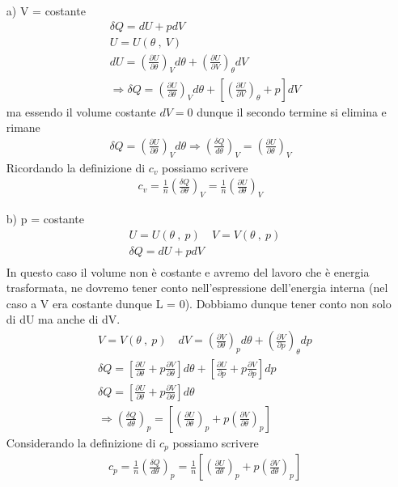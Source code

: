\documentclass[
10pt, %
a4paper, %
oneside, %
headinclude,footinclude, %
BCOR5mm, %
]{scrartcl}
\begin{document}
\begin{itemize}
	\item[a)] V = costante\\
	\begin{align*} 
		&\delta Q = dU + pdV\\
		&U = U(\theta\ ,\ V)\\
		&dU = \left(\frac{\partial U}{\partial \theta}\right)_V d\theta +\left(\frac{\partial U}{\partial V}\right)_{\theta} dV\\
		&\Rightarrow \delta Q = \left(\frac{\partial U}{\partial \theta}\right)_V d\theta +\left[\left(\frac{\partial U}{\partial V}\right)_{\theta}+p\right]dV
	\end{align*} 
	ma essendo il volume costante \(dV = 0\) dunque il secondo termine si elimina e rimane
	\begin{align*} 
		\delta Q = \left(\frac{\partial U}{\partial \theta}\right)_V d\theta \Rightarrow \left(\frac{\delta Q}{d \theta}\right)_V = \left(\frac{\partial U}{\partial \theta}\right)_V
	\end{align*} 
	Ricordando la definizione di \(c_v\) possiamo scrivere
	\begin{align*} 
		c_v = \frac{1}{n} \left( \frac{\delta Q}{\partial \theta}\right)_V = \frac{1}{n} \left(\frac{\partial U}{\partial \theta}\right)_V
	\end{align*} 
	\item[b)] p = costante\\
	\begin{align*} 
		&U = U(\theta\ ,\ p) \quad V = V(\theta\ ,\ p)\\
		&\delta Q = dU + pdV\\
	\end{align*} 
	In questo caso il volume non è costante e avremo del lavoro che è energia trasformata, ne dovremo tener conto nell'espressione dell'energia interna (nel caso a V era costante dunque L = 0). Dobbiamo dunque tener conto non solo di dU ma anche di dV.
	\begin{align*} 
		&V = V(\theta\ ,\ p) \quad dV = \left( \frac{\partial V}{\partial \theta}\right)_p d\theta + \left( \frac{\partial V}{\partial p}\right)_{\theta} dp\\
		&\delta Q = \left[\frac{\partial U}{\partial \theta} + p \frac{\partial V}{\partial \theta}\right]d\theta + \left[\frac{\partial U}{\partial p}+ p \frac{\partial V}{\partial p} \right]dp\\
		&\delta Q = \left[\frac{\partial U}{\partial \theta} + p \frac{\partial V}{\partial \theta}\right]d\theta\\
		&\Rightarrow \left(\frac{\delta Q}{d \theta}\right)_p = \left[\left(\frac{\partial U}{\partial \theta}\right)_p + p \left(\frac{\partial V}{\partial \theta}\right)_p\right]
	\end{align*}  
	Considerando la definizione di \(c_p\) possiamo scrivere
	\begin{align*} 
		&c_p = \frac{1}{n}\left(\frac{\delta Q}{d\theta}\right)_p = \frac{1}{n} \left[\left(\frac{\partial U}{d \theta}\right)_p + p \left(\frac{\partial V}{d \theta}\right)_p\right]
	\end{align*} 
\end{itemize} 
\end{document}
